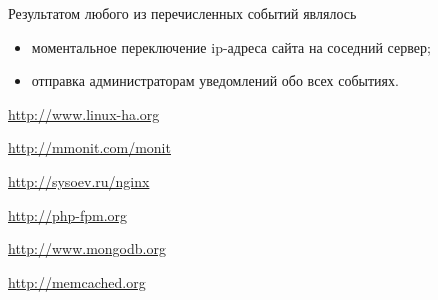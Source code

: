 \documentclass[10pt, a5paper]{article}
\begin{document}
Результатом любого из перечисленных событий являлось

\begin{itemize}
  \item моментальное переключение ip-адреса сайта на соседний сервер;
  \item отправка администраторам уведомлений обо всех событиях.
\end{itemize}


\begin{thebibliography}{9}

 \url{http://www.linux-ha.org}

 \url{http://mmonit.com/monit}

 \url{http://sysoev.ru/nginx}

 \url{http://php-fpm.org}

 \url{http://www.mongodb.org}

 \url{http://memcached.org}

\end{thebibliography}
\end{document}
